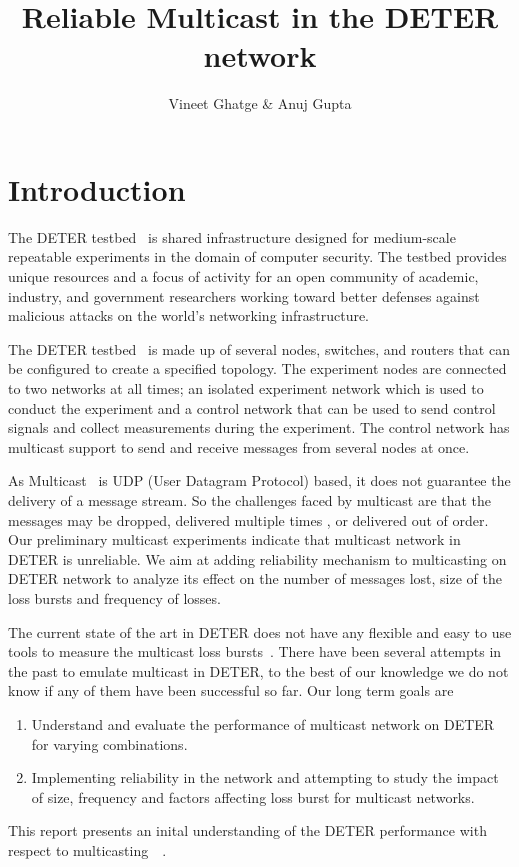 \documentclass[11pt]{article}
\title{Reliable Multicast in the DETER network}
\author{
Vineet Ghatge & Anuj Gupta
}
\begin{document}
\maketitle

\section{Introduction}
\label{sec:intro}
The DETER testbed~\cite{Peterson} is shared infrastructure designed for medium-scale repeatable experiments in the domain of computer security. The testbed provides unique resources and a focus of activity for an open community of academic, industry, and government researchers working toward better defenses against malicious attacks on the world's networking infrastructure.

The DETER testbed~\cite{Peterson} is made up of several nodes, switches, and routers that can be configured to create a specified topology. The experiment nodes are connected to two networks at all times; an isolated experiment network which is used to conduct the experiment and a control network that can be used to send control signals and collect measurements during the experiment. The control network has multicast support to send and receive messages from several nodes at once. 

As Multicast~\cite{Intro} is UDP (User Datagram Protocol) based, it does not guarantee the delivery of a message stream. So the challenges faced by multicast are that the messages may be dropped, delivered multiple times , or delivered out of order. Our preliminary multicast experiments indicate that multicast network in DETER is unreliable. We aim at adding reliability mechanism to multicasting on DETER network to analyze its effect on the number of messages lost, size of the loss bursts and frequency of losses.

The current state of the art in DETER does not have any flexible and easy to use tools to measure the multicast loss bursts~\cite{DETER}. There have been several attempts in the past to emulate multicast in DETER, to the best of our knowledge we do not know if any of them have been successful so far. Our long term goals are 
\begin{enumerate}
\item Understand and evaluate the performance of multicast network on DETER for varying combinations.
\item Implementing reliability in the network and attempting to study the impact of size, frequency and factors affecting loss burst for multicast networks.
\end{enumerate}
This report presents an inital understanding of the DETER performance with respect to multicasting~\cite{PGM}~\cite{SRM}.
\end{document}
